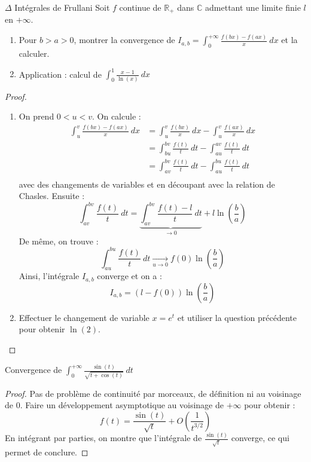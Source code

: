 \documentclass[french,a4paper]{article}
\newcommand{\R}{\mathbb{R}}
\newcommand{\C}{\mathbb{C}}
\theoremstyle{plain}
\theoremstyle{definition}
\theoremstyle{remark}
\begin{document}
\begin{ex}[Moulin.IG.54]{$\Delta$ Intégrales de Frullani}
	Soit $f$ continue de $\R_+$ dans $\C$ admettant une limite finie $l$ en $+\infty$.
	\begin{enumerate}
		\item Pour $b>a>0$, montrer la convergence de $I_{a,b}=\displaystyle\int_{0}^{+\infty}\frac{f(bx)-f(ax)}{x}\ dx$ et la calculer.
		\item Application : calcul de $\displaystyle\int_{0}^{1}\frac{x-1}{\ln(x)}\ dx$
	\end{enumerate}
\end{ex}
\begin{proof}
	\begin{enumerate}
		\item On prend $0<u<v$. On calcule : \begin{align*}
			\int_{u}^{v}\frac{f(bx)-f(ax)}{x}\ dx&=\int_{u}^{v}\frac{f(bx)}{x}\ dx-\int_{u}^{v}\frac{f(ax)}{x}\ dx \\
			&= \int_{bu}^{bv}\frac{f(t)}{t}\ dt-\int_{au}^{av}\frac{f(t)}{t}\ dt \\
			&=\int_{av}^{bv}\frac{f(t)}{t}\ dt-\int_{au}^{bu}\frac{f(t)}{t}\ dt \\
		\end{align*} avec des changements de variables et en découpant avec la 	relation de Chasles. Ensuite : $$\int_{av}^{bv}\frac{f(t)}{t}\ dt=\underbrace{\int_{av}^{bv}\frac{f(t)-l}{t}\ dt}_{\to0}+l\ln\left(\frac{b}{a}\right)$$ De même, on trouve : $$\int_{au}^{bu}\frac{f(t)}{t}\ dt\xrightarrow[u\to 0]{}f(0)\ln\left(\frac{b}{a}\right)$$ Ainsi, l'intégrale $I_{a,b}$ converge et on a : $$I_{a,b}=(l-f(0))\ln\left(\frac{b}{a}\right)$$
		\item Effectuer le changement de variable $x=e^{t}$ et utiliser la question précédente pour obtenir $\ln(2)$.
	\end{enumerate}
\end{proof}

\begin{ex}[Moulin.IG.55]{}
	Convergence de $\displaystyle\int_{0}^{+\infty}\frac{\sin(t)}{\sqrt{t+\cos(t)}}\ dt$
\end{ex}
\begin{proof}
	Pas de problème de continuité par morceaux, de définition ni au voisinage de $0$. Faire un développement asymptotique au voisinage de $+\infty$ pour obtenir : $$f(t)=\frac{\sin(t)}{\sqrt{t}}+O\left(\frac{1}{t^{3/2}}\right)$$ En intégrant par parties, on montre que l'intégrale de $\displaystyle\frac{\sin(t)}{\sqrt{t}}$ converge, ce qui permet de conclure.
\end{proof}
\end{document}
